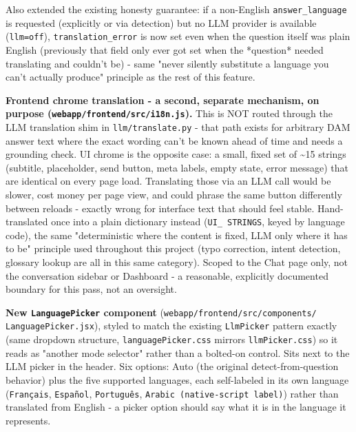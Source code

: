 Also extended the existing honesty guarantee: if a non-English \texttt{answer\_\allowbreak{}language} is requested (explicitly or via detection) but no LLM provider is available (\texttt{llm=off}), \texttt{translation\_\allowbreak{}error} is now set even when the question itself was plain English (previously that field only ever got set when the *question* needed translating and couldn't be) - same "never silently substitute a language you can't actually produce" principle as the rest of this feature.

\textbf{Frontend chrome translation - a second, separate mechanism, on purpose (\texttt{webapp/\allowbreak{}frontend/\allowbreak{}src/\allowbreak{}i18n.js}).} This is NOT routed through the LLM translation shim in \texttt{llm/\allowbreak{}translate.py} - that path exists for arbitrary DAM answer text where the exact wording can't be known ahead of time and needs a grounding check. UI chrome is the opposite case: a small, fixed set of \textasciitilde{}15 strings (subtitle, placeholder, send button, meta labels, empty state, error message) that are identical on every page load. Translating those via an LLM call would be slower, cost money per page view, and could phrase the same button differently between reloads - exactly wrong for interface text that should feel stable. Hand-translated once into a plain dictionary instead (\texttt{UI\_\allowbreak{} STRINGS}, keyed by language code), the same "deterministic where the content is fixed, LLM only where it has to be" principle used throughout this project (typo correction, intent detection, glossary lookup are all in this same category). Scoped to the Chat page only, not the conversation sidebar or Dashboard - a reasonable, explicitly documented boundary for this pass, not an oversight.

\textbf{New \texttt{LanguagePicker} component} (\texttt{webapp/\allowbreak{}frontend/\allowbreak{}src/\allowbreak{}components/\allowbreak{} LanguagePicker.jsx}), styled to match the existing \texttt{LlmPicker} pattern exactly (same dropdown structure, \texttt{languagePicker.css} mirrors \texttt{llmPicker.css}) so it reads as "another mode selector" rather than a bolted-on control. Sits next to the LLM picker in the header. Six options: Auto (the original detect-from-question behavior) plus the five supported languages, each self-labeled in its own language (\texttt{Français}, \texttt{Español}, \texttt{Português}, \texttt{Arabic (native-script label)}) rather than translated from English - a picker option should say what it is in the language it represents.

